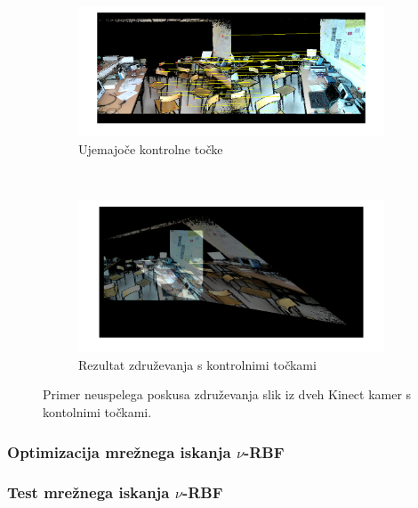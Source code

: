  \begin{figure}[htb]
 	\centering
 	\begin{subfigure}[t]{0.45\columnwidth}
 		\includegraphics[width=\columnwidth]{./Slike/matched-points.png}
 		\caption{Ujemajoče kontrolne točke}
 		\label{fig:zdruzevanje-ujemajoce-cp}
 	\end{subfigure}
 	~
 	\begin{subfigure}[t]{0.45\columnwidth}
 		\includegraphics[width=\columnwidth]{./Slike/points-calibration-result.png}
 		\caption{Rezultat združevanja s kontrolnimi točkami}
 		\label{fig:zdruzevanje-result-cp}
 	\end{subfigure}
 	\caption{Primer neuspelega poskusa združevanja slik iz dveh Kinect kamer s kontolnimi točkami.}
 	\label{fig:zdruzevanje-cp}
 \end{figure}







\subsubsection{Optimizacija mrežnega iskanja \texorpdfstring{$\nu$}{nu}-RBF}





\subsubsection{Test mrežnega iskanja \texorpdfstring{$\nu$}{nu}-RBF}





